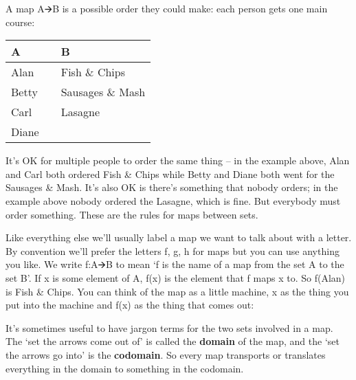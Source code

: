\documentclass[oneside,english]{amsbook}
\numberwithin{section}{chapter}
\theoremstyle{plain}
\theoremstyle{definition}
\begin{document}
A map A🡪B is a possible order they could make: each person gets one main
course:

\begin{longtable}[]{@{}
		>{\centering\arraybackslash}p{}
		>{\centering\arraybackslash}p{}
		>{\centering\arraybackslash}p{}@{}}
	\toprule\noalign{}
	\begin{minipage}[b]{\linewidth}\centering
		\textbf{A}
	\end{minipage} & \begin{minipage}[b]{\linewidth}\centering
	\end{minipage} & \begin{minipage}[b]{\linewidth}\centering
		\textbf{B}
	\end{minipage} \\
	\midrule\noalign{}
	\endhead
	\bottomrule\noalign{}
	\endlastfoot
	Alan & & Fish \& Chips \\
	Betty & & Sausages \& Mash \\
	Carl & & Lasagne \\
	Diane & & \\
\end{longtable}

It's OK for multiple people to order the same thing -- in the example
above, Alan and Carl both ordered Fish \& Chips while Betty and Diane
both went for the Sausages \& Mash. It's also OK is there's something
that nobody orders; in the example above nobody ordered the Lasagne,
which is fine. But everybody must order something. These are the rules
for maps between sets.

Like everything else we'll usually label a map we want to talk about
with a letter. By convention we'll prefer the letters f, g, h for maps
but you can use anything you like. We write f:A🡪B to mean `f is the
name of a map from the set A to the set B'. If x is some element of A,
f(x) is the element that f maps x to. So f(Alan) is Fish \& Chips. You
can think of the map as a little machine, x as the thing you put into
the machine and f(x) as the thing that comes out:

It's sometimes useful to have jargon terms for the two sets involved in
a map. The `set the arrows come out of' is called the \textbf{domain}
of the map, and the `set the arrows go into' is the \textbf{codomain}.
So every map transports or translates everything in the domain to
something in the codomain.
\end{document}
